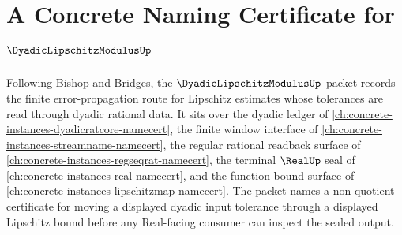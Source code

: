 \chapter{A Concrete Naming Certificate for $\DyadicLipschitzModulusUp$}
\label{ch:concrete-instances-dyadic-lipschitz-modulus-namecert}

Following Bishop and Bridges, the $\DyadicLipschitzModulusUp$ packet records the finite error-propagation route for Lipschitz estimates whose tolerances are read through dyadic rational data. It sits over the dyadic ledger of \autoref{ch:concrete-instances-dyadicratcore-namecert}, the finite window interface of \autoref{ch:concrete-instances-streamname-namecert}, the regular rational readback surface of \autoref{ch:concrete-instances-regseqrat-namecert}, the terminal $\RealUp$ seal of \autoref{ch:concrete-instances-real-namecert}, and the function-bound surface of \autoref{ch:concrete-instances-lipschitzmap-namecert}. The packet names a non-quotient certificate for moving a displayed dyadic input tolerance through a displayed Lipschitz bound before any Real-facing consumer can inspect the sealed output.

